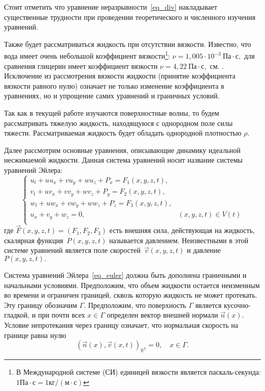 Стоит отметить что уравнение неразрывности~\eqref{eq_div} накладывает существенные трудности при проведении теоретического и численного изучения уравнений.

Также будет рассматриваться жидкость при отсутствии вязкости. Известно, что  вода имеет очень небольшой коэффициент вязкости\footnote{В Международной системе (СИ) единицей вязкости является паскаль-секунда:
$1\mbox{Па}\cdot\mbox{с}=1\mbox{кг}/(\mbox{м}\cdot\mbox{с})$}:
$\nu=1,005\cdot 10^{-3}\ \mbox{Па}\cdot\mbox{с},$ для сравнения
глицерин имеет коэффициент вязкости $\nu=4,22\
\mbox{Па}\cdot\mbox{с},$ см. \cite{loyts}. Исключение из
рассмотрения вязкости жидкости (принятие коэффициента вязкости
равного нулю) означает не только изменение коэффициента в
уравнениях, но и упрощение самих уравнений и граничных условий.

Так как в текущей работе изучаются поверхностные волны, то будем
рассматривать тяжелую жидкость, находящуюся с однородном поле силы
тяжести. Рассматриваемая жидкость будет обладать однородной плотностью $\rho$.

Далее рассмотрим основные уравнения, описывающие динамику идеальной
несжимаемой жидкости. Данная система уравнений носит название системы уравнений Эйлера:
\begin{equation}\label{eq_euler}
\begin{cases}
u_t + uu_x + vu_y + wu_z + P_x =
F_1(x,y,z,t), & \\
v_t + uv_x + vv_y + wv_z + P_y =
F_2(x,y,z,t), & \\
w_t + uw_x + vw_y + ww_z + P_z =
F_3(x,y,z,t), & \\
u_x+v_y+w_z=0, & (x,y,z,t)\in V(t)  \\
\end{cases}
\end{equation}
где $\overrightarrow F(x,y,z,t)=(F_1,F_2,F_3)$ есть внешняя сила,
действующая на жидкость, скалярная функ\-ция~$P(x,y,z,t)$ называется
давлением. Неизвестными в этой системе уравнений является поле
ско\-рос\-тей~$\overrightarrow v(x,y,z,t)$ и давление $P(x,y,z,t).$

Система уравнений Эйлера~\eqref{eq_euler} должна быть дополнена
граничными и начальными условиями. Предположим, что объем жидкости
остается неизменным во времени и ограничен границей, сквозь
которую жидкость не может протекать. Эту границу обозначим
$\Gamma.$ Предположим, что поверхность $\Gamma$ является
кусочно-гладкой, и при почти всех $x\in\Gamma$ определен вектор
внешней нормали $\overrightarrow n(x).$ Условие непротекания через
границу означает, что нормальная скорость на границе равна нулю
\begin{equation}\label{eq_nonn}
(\overrightarrow n(x), \overrightarrow v(x,t))_{\mathbb{R}^3}=0,\quad
x\in\Gamma.
\end{equation}


